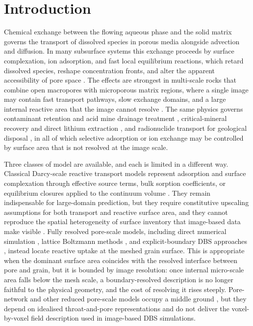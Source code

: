 \section{Introduction}

Chemical exchange between the flowing aqueous phase and the solid matrix
governs the transport of dissolved species in porous media alongside advection
and diffusion. In many subsurface systems this exchange proceeds by surface
complexation, ion adsorption, and fast local equilibrium reactions, which
retard dissolved species, reshape concentration fronts, and alter the apparent
accessibility of pore space \citep{dzombak1990surface}. The effects are
strongest in multi-scale rocks that combine open macropores with microporous
matrix regions, where a single image may contain fast transport pathways, slow
exchange domains, and a large internal reactive area that the image cannot
resolve \citep{menke2021upscaling}. The same physics governs contaminant
retention and acid mine drainage treatment
\citep{webster1998trace,blowes2000treatment}, critical-mineral recovery and
direct lithium extraction \citep{reich2022lithium,vera2023environmental}, and
radionuclide transport for geological disposal
\citep{miller2010upscaling,dewindt2019reactive,bildstein2019rtm}, in all of
which selective adsorption or ion exchange may be controlled by surface area
that is not resolved at the image scale.

Three classes of model are available, and each is limited in a different way.
Classical Darcy-scale reactive transport models represent adsorption and
surface complexation through effective source terms, bulk sorption
coefficients, or equilibrium closures applied to the continuum volume
\citep{steefel1990kinetic,steefel1994coupled,steefel2015reactive,mayer2002multicomponent,xu2006toughreact,lichtner1985continuum}.
They remain indispensable for large-domain prediction, but they require
constitutive upscaling assumptions for both transport and reactive surface
area, and they cannot reproduce the spatial heterogeneity of surface inventory
that image-based data make visible \citep{battiato2011applicability}. Fully
resolved pore-scale models, including direct numerical simulation
\citep{molins2021simulation,molins2015reactive,molins2012investigation,starchenko2018development},
lattice Boltzmann methods \citep{yoon2015lattice,kang2007lattice}, and
explicit-boundary DBS approaches
\citep{maes2018direct,maes2021geochemfoam,soulaine2017mineral}, instead locate
reactive uptake at the meshed grain surface. This is appropriate when the
dominant surface area coincides with the resolved interface between pore and
grain, but it is bounded by image resolution: once internal micro-scale area
falls below the mesh scale, a boundary-resolved description is no longer
faithful to the physical geometry, and the cost of resolving it rises steeply.
Pore-network and other reduced pore-scale models occupy a middle ground
\citep{blunt2001flow}, but they depend on idealised throat-and-pore
representations and do not deliver the voxel-by-voxel field description used in
image-based DBS simulations.

